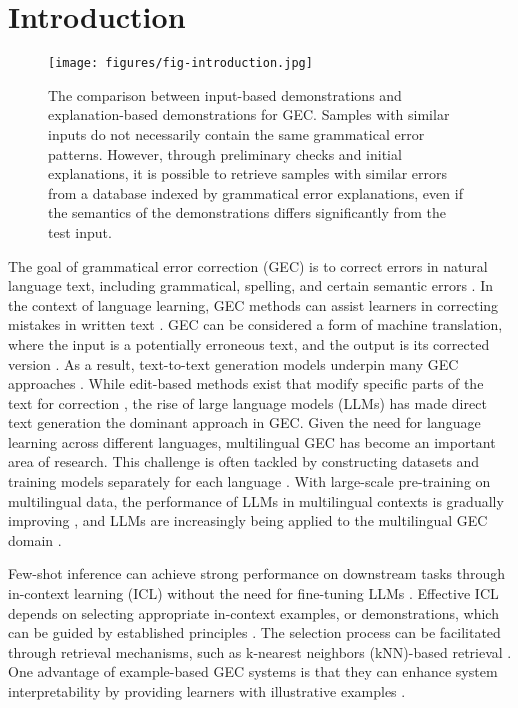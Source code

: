 \section{Introduction}

\begin{figure}[t]
    \centering
    \texttt{[image: figures/fig-introduction.jpg]}
    \caption{The comparison between input-based demonstrations and explanation-based demonstrations for GEC. Samples with similar inputs do not necessarily contain the same grammatical error patterns. However, through preliminary checks and initial explanations, it is possible to retrieve samples with similar errors from a database indexed by grammatical error explanations, even if the semantics of the demonstrations differs significantly from the test input.}
    \label{fig:intro}
\end{figure}


The goal of grammatical error correction (GEC) is to correct errors in natural language text, including grammatical, spelling, and certain semantic errors \cite{2023gecsurvey}. In the context of language learning, GEC methods can assist learners in correcting mistakes in written text \cite{katinskaia2021assessing_in_learning, caines2023teaching_application_gec}. GEC can be considered a form of machine translation, where the input is a potentially erroneous text, and the output is its corrected version \cite{yuan-briscoe-2016-grammatical}. As a result, text-to-text generation models underpin many GEC approaches \cite{junczys-dowmunt-etal-2018-approaching, katsumata-komachi-2020-stronger}. While edit-based methods exist that modify specific parts of the text for correction \cite{awasthi2019parallel_edit_seq2edit_gec, omelianchuk-etal-2020-gector}, the rise of large language models (LLMs) \cite{brown2020gpt3, touvron2023llama} has made direct text generation the dominant approach in GEC. Given the need for language learning across different languages, multilingual GEC has become an important area of research. This challenge is often tackled by constructing datasets and training models separately for each language \cite{ijcai2022-unified-mgec, rothe2021clang8_gec}. With large-scale pre-training on multilingual data, the performance of LLMs in multilingual contexts is gradually improving \cite{qin2024multilingualllms}, and LLMs are increasingly being applied to the multilingual GEC domain \cite{luhtaru-etal-2024-nllb-gec}.

Few-shot inference can achieve strong performance on downstream tasks through in-context learning (ICL) without the need for fine-tuning LLMs \cite{brown2020gpt3}. Effective ICL depends on selecting appropriate in-context examples, or demonstrations, which can be guided by established principles \cite{agrawal-etal-2023-context}. The selection process can be facilitated through retrieval mechanisms, such as k-nearest neighbors (kNN)-based retrieval \cite{vasselli-watanabe-2023-knngec}. One advantage of example-based GEC systems is that they can enhance system interpretability by providing learners with illustrative examples \cite{kaneko-etal-2022-interpretability}.

